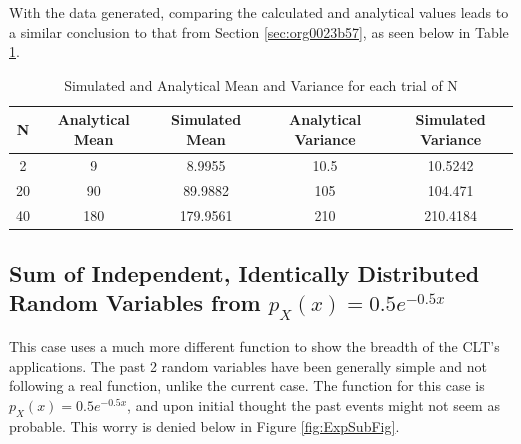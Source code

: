 \documentclass[a4paper, 11pt]{article}
\begin{document}
\medskip
\noindent
With the data generated, comparing the calculated and analytical values leads to a similar conclusion to that from Section \ref{sec:org0023b57}, as seen below in Table \ref{tab:DiscreteTab}.

\begin{table}[htbp]
\caption{\label{tab:DiscreteTab}Simulated and Analytical Mean and Variance for each trial of N}
\centering
\begin{tabular}{|c|c|c|c|c|}
\hline
N & Analytical Mean & Simulated Mean & Analytical Variance & Simulated Variance\\
\hline
2 & 9 & 8.9955 & 10.5 & 10.5242\\
20 & 90 & 89.9882 & 105 & 104.471\\
40 & 180 & 179.9561 & 210 & 210.4184\\
\hline
\end{tabular}
\end{table}

\subsection{Sum of Independent, Identically Distributed Random Variables from \(p_X(x)=0.5e^{-0.5x}\)}
\label{sec:org69fa2f4}
This case uses a much more different function to show the breadth of the CLT's applications. The past 2 random variables have been generally simple and not following a real function, unlike the current case.
The function for this case is \(p_X(x)=0.5e^{-0.5x}\), and upon initial thought the past events might not seem as probable.
This worry is denied below in Figure \ref{fig:ExpSubFig}.
\end{document}
